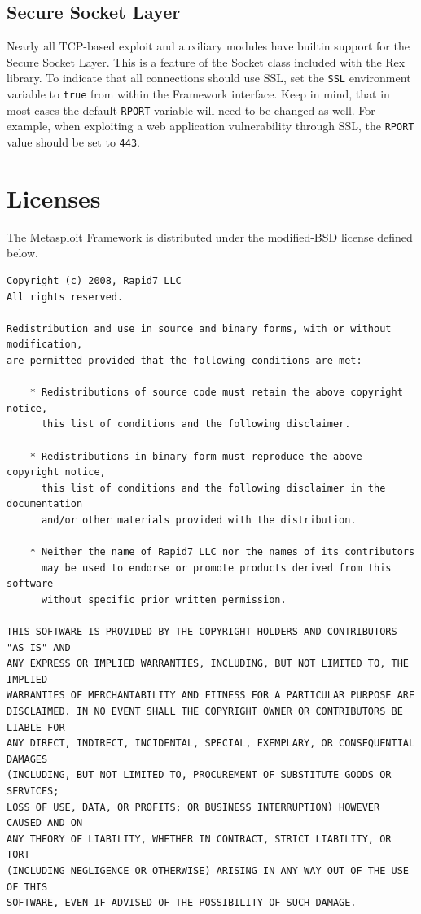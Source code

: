 \documentclass{report}
\begin{document}
	\section{Secure Socket Layer}
	\label{REF-SSL}
\par
Nearly all TCP-based exploit and auxiliary modules have builtin support for the Secure Socket Layer.
This is a feature of the Socket class included with the Rex library. To indicate that all connections
should use SSL, set the \texttt{SSL} environment variable to \texttt{true} from within the Framework
interface. Keep in mind, that in most cases the default \texttt{RPORT} variable will need to be 
changed as well. For example, when exploiting a web application vulnerability through SSL, the
\texttt{RPORT} value should be set to \texttt{443}.

\pagebreak
\chapter{Licenses}

\par
The Metasploit Framework is distributed under the modified-BSD license defined below.

{\footnotesize
\begin{verbatim}
Copyright (c) 2008, Rapid7 LLC
All rights reserved.

Redistribution and use in source and binary forms, with or without modification,
are permitted provided that the following conditions are met:

    * Redistributions of source code must retain the above copyright notice, 
	  this list of conditions and the following disclaimer.

    * Redistributions in binary form must reproduce the above copyright notice,
	  this list of conditions and the following disclaimer in the documentation
	  and/or other materials provided with the distribution.

    * Neither the name of Rapid7 LLC nor the names of its contributors 
	  may be used to endorse or promote products derived from this software 
	  without specific prior written permission.

THIS SOFTWARE IS PROVIDED BY THE COPYRIGHT HOLDERS AND CONTRIBUTORS "AS IS" AND
ANY EXPRESS OR IMPLIED WARRANTIES, INCLUDING, BUT NOT LIMITED TO, THE IMPLIED 
WARRANTIES OF MERCHANTABILITY AND FITNESS FOR A PARTICULAR PURPOSE ARE 
DISCLAIMED. IN NO EVENT SHALL THE COPYRIGHT OWNER OR CONTRIBUTORS BE LIABLE FOR
ANY DIRECT, INDIRECT, INCIDENTAL, SPECIAL, EXEMPLARY, OR CONSEQUENTIAL DAMAGES
(INCLUDING, BUT NOT LIMITED TO, PROCUREMENT OF SUBSTITUTE GOODS OR SERVICES; 
LOSS OF USE, DATA, OR PROFITS; OR BUSINESS INTERRUPTION) HOWEVER CAUSED AND ON
ANY THEORY OF LIABILITY, WHETHER IN CONTRACT, STRICT LIABILITY, OR TORT 
(INCLUDING NEGLIGENCE OR OTHERWISE) ARISING IN ANY WAY OUT OF THE USE OF THIS
SOFTWARE, EVEN IF ADVISED OF THE POSSIBILITY OF SUCH DAMAGE.
\end{verbatim}}
\end{document}
